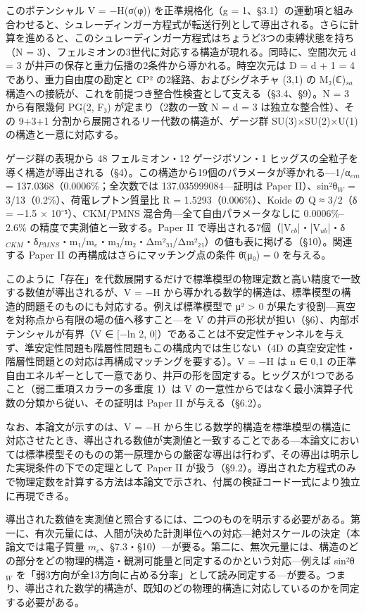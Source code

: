 \documentclass[fontsize=11pt,paper=a4,lualatex]{jlreq}
\begin{document}
このポテンシャル V = −H(σ(φ)) を正準規格化（g = 1、§3.1）の運動項と組み合わせると、シュレーディンガー方程式が転送行列として導出される。さらに計算を進めると、このシュレーディンガー方程式はちょうど3つの束縛状態を持ち（N = 3）、フェルミオンの3世代に対応する構造が現れる。同時に、空間次元 d = 3 が井戸の保存と重力伝播の2条件から導かれる。時空次元は D = d + 1 = 4 であり、重力自由度の勘定と ℂP² の2経路、およびシグネチャ (3,1) の M₂(ℂ)$_{sa}$ 構造への接続が、これを前提つき整合性検査として支える（§3.4、§9）。N = 3 から有限幾何 PG(2, F₃) が定まり（2数の一致 N = d = 3 は独立な整合性）、その 9+3+1 分割から展開されるリー代数の構造が、ゲージ群 SU(3)×SU(2)×U(1) の構造と一意に対応する。

ゲージ群の表現から 48 フェルミオン・12 ゲージボソン・1 ヒッグスの全粒子を導く構造が導出される（§4）。この構造から19個のパラメータが導かれる---1/α$_{em}$ = 137.0368（0.0006\%；全次数では 137.035999084---証明は Paper II）、sin²θ$_W$ = 3/13（0.2\%）、荷電レプトン質量比 R = 1.5293（0.006\%）、Koide の Q ≈ 3/2（δ = −1.5 × 10⁻⁵）、CKM/PMNS 混合角---全て自由パラメータなしに 0.0006\%–2.6\% の精度で実測値と一致する。Paper II で導出される7個（|V$_{cb}$|・|V$_{ub}$|・δ$_{CKM}$・δ$_{PMNS}$・m₁/m$_e$・m₃/m₂・Δm²₃₁/Δm²₂₁）の値も表に掲げる（§10）。関連する Paper II の再構成はさらにマッチング点の条件 θ̄(μ₀) = 0 を与える。

このように「存在」を代数展開するだけで標準模型の物理定数と高い精度で一致する数値が導出されるが、V = −H から導かれる数学的構造は、標準模型の構造的問題そのものにも対応する。例えば標準模型で μ² > 0 が果たす役割---真空を対称点から有限の場の値へ移すこと---を V の井戸の形状が担い（§6）、内部ポテンシャルが有界（V ∈ [−ln 2, 0]）であることは不安定性チャンネルを与えず、準安定性問題も階層性問題もこの構成内では生じない（4D の真空安定性・階層性問題との対応は再構成マッチングを要する）。V = −H は n ∈ {0,1} の正準自由エネルギーとして一意であり、井戸の形を固定する。ヒッグスが1つであること（弱二重項スカラーの多重度 1）は V の一意性からではなく最小演算子代数の分類から従い、その証明は Paper II が与える（§6.2）。

なお、本論文が示すのは、V = −H から生じる数学的構造を標準模型の構造に対応させたとき、導出される数値が実測値と一致することである---本論文においては標準模型そのものの第一原理からの厳密な導出は行わず、その導出は明示した実現条件の下での定理として Paper II が扱う（§9.2）。導出された方程式のみで物理定数を計算する方法は本論文で示され、付属の検証コード一式により独立に再現できる。

導出された数値を実測値と照合するには、二つのものを明示する必要がある。第一に、有次元量には、人間が決めた計測単位への対応---絶対スケールの決定（本論文では電子質量 $m_e$、\S7.3・\S10）---が要る。第二に、無次元量には、構造のどの部分をどの物理的構造・観測可能量と同定するのかという対応---例えば sin²θ$_W$ を「弱3方向が全13方向に占める分率」として読み同定する---が要る。つまり、導出された数学的構造が、既知のどの物理的構造に対応しているのかを同定する必要がある。
\end{document}
